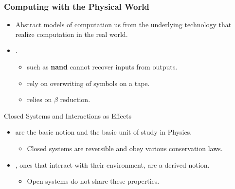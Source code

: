 \documentclass[svgnames,11pt]{beamer}
\newcommand{\red}[1]{{\color{red}{#1}}}
\newcommand{\lcal}{\ensuremath{\lambda}-calculus\xspace}
\begin{document}
\begin{frame}
\frametitle{Computing with the Physical World}
  \begin{itemize}

\item Abstract models of computation \red{shield} us from the
  underlying technology that realize computation in the real world.


\vfill
\item \red{Irreversible classical worldview}.

    \begin{itemize}


\vfill
    \item \red{Logic gates} such as \textbf{nand} cannot recover inputs from outputs.


\vfill
\item \red{Turing machines} rely on overwriting of symbols on a tape.


\vfill
\item \red{\lcal} relies on $\beta$ reduction.

    \end{itemize}

  \end{itemize}

\vfill

\end{frame}



\begin{frame}{Closed Systems and Interactions as Effects}

  \begin{itemize}

\vfill
\item \red{Closed systems} are the basic notion and the basic
  unit of study in Physics. 

  \begin{itemize}
  \item Closed systems are reversible and obey various conservation
  laws.

  \end{itemize}

\vfill
\item \red{Open systems}, ones that interact with their environment,
  are a derived notion.

  \begin{itemize}
  \item Open systems do not share these properties.

  \end{itemize}


\vfill

  \end{itemize}

\end{frame}
\end{document}
